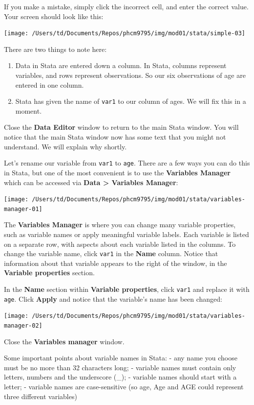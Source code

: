 \documentclass[
]{memoir}
\providecommand{\tightlist}{%
  \setlength{\itemsep}{0pt}\setlength{\parskip}{0pt}}
\begin{document}
If you make a mistake, simply click the incorrect cell, and enter the correct value. Your screen should look like this:

\texttt{[image: /Users/td/Documents/Repos/phcm9795/img/mod01/stata/simple-03]}

There are two things to note here:

\begin{enumerate}
\def\labelenumi{\arabic{enumi}.}
\tightlist
\item
  Data in Stata are entered down a column. In Stata, columns represent variables, and rows represent observations. So our six observations of age are entered in one column.
\item
  Stata has given the name of \texttt{var1} to our column of ages. We will fix this in a moment.
\end{enumerate}

Close the \textbf{Data Editor} window to return to the main Stata window. You will notice that the main Stata window now has some text that you might not understand. We will explain why shortly.

Let's rename our variable from \texttt{var1} to \texttt{age}. There are a few ways you can do this in Stata, but one of the most convenient is to use the \textbf{Variables Manager} which can be accessed via \textbf{Data \textgreater{} Variables Manager}:

\texttt{[image: /Users/td/Documents/Repos/phcm9795/img/mod01/stata/variables-manager-01]}

The \textbf{Variables Manager} is where you can change many variable properties, such as variable names or apply meaningful variable labels. Each variable is listed on a separate row, with aspects about each variable listed in the columns. To change the variable name, click \texttt{var1} in the \textbf{Name} column. Notice that information about that variable appears to the right of the window, in the \textbf{Variable properties} section.

In the \textbf{Name} section within \textbf{Variable properties}, click \texttt{var1} and replace it with \texttt{age}. Click \textbf{Apply} and notice that the variable's name has been changed:

\texttt{[image: /Users/td/Documents/Repos/phcm9795/img/mod01/stata/variables-manager-02]}

Close the \textbf{Variables manager} window.

Some important points about variable names in Stata:
- any name you choose must be no more than 32 characters long;
- variable names must contain only letters, numbers and the underscore (\_);
- variable names should start with a letter;
- variable names are case-sensitive (so age, Age and AGE could represent three different variables)
\end{document}
